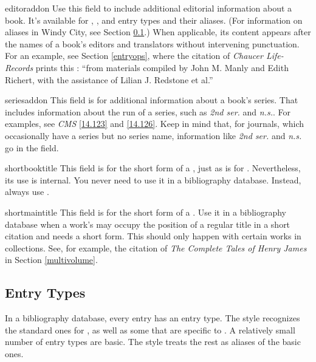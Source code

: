 \documentclass[11pt,letterpaper,oneside]{article}
\begin{document}
\begin{marglist}

\item[editoraddon] Use this field to include additional editorial
information about a book. It's available for ,
, and  entry types and their
aliases. (For information on aliases in Windy City, see Section
\ref{entrytypes}.) When applicable, its content appears after the
names of a book's editors and translators without intervening
punctuation. For an example, see Section \ref{entryops}, where the
citation of \textit{Chaucer Life-Records} prints this
: ``from materials compiled by John M. Manly and
Edith Richert, with the assistance of Lilian J. Redstone et al.''

\item[seriesaddon] This field is for additional information about a
book's series. That includes information about the run of a series,
such as \textit{2nd ser.} and \textit{n.s.}. For examples, see
\textit{CMS} \ref{14.123} and \ref{14.126}. Keep in mind that, for
journals, which occasionally have a series but no series name,
information like \textit{2nd ser.} and \textit{n.s.} go in the
 field.

\item[shortbooktitle] This field is for the short form of a
, just as  is for
. Nevertheless, its use is internal. You never need to
use it in a bibliography database. Instead, always use
.

\item[shortmaintitle] This field is for the short form of a
. Use it in a bibliography database when a work's
 may occupy the position of a regular title in a
short citation and needs a short form. This should only happen with
certain works in collections. See, for example, the citation of
\textit{The Complete Tales of Henry James} in Section
\ref{multivolume}.

\end{marglist}

\subsection{Entry Types}
\label{entrytypes}

In a bibliography database, every entry has an entry type. The style
recognizes the standard ones for \BibTeX, as well as some that are
specific to \biblatex. A relatively small number of entry types are
basic. The style treats the rest as aliases of the basic ones.
\end{document}
